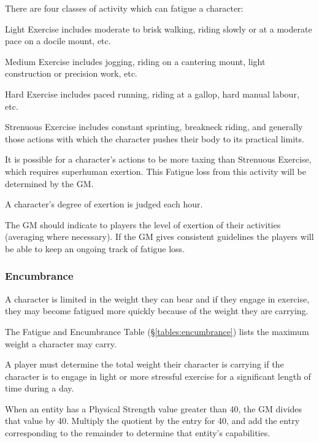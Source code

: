 \begin{multicols*}{3}
There are four classes of activity which can fatigue a character:
\begin{Enumerate}
\item
Light Exercise includes moderate to brisk walking, riding slowly or at
a moderate pace on a docile mount, etc.

\item
Medium Exercise includes jogging, riding on a cantering mount, light
construction or precision work, etc.

\item
Hard Exercise includes paced running, riding at a gallop, hard manual
labour, etc.

\item
Strenuous Exercise includes constant sprinting, breakneck riding, and
generally those actions with which the character pushes their body to
its practical limits.
\end{Enumerate}

It is possible for a character's actions to be more taxing than
Strenuous Exercise, which requires superhuman exertion. This Fatigue
loss from this activity will be determined by the GM.

A character's degree of exertion is judged each hour. 

The GM should indicate to players the level of exertion of their
activities (averaging where necessary). If the GM gives consistent
guidelines the players will be able to keep an ongoing track of
fatigue loss.

\subsubsection{Encumbrance}

A character is limited in the weight they can bear and if they engage
in exercise, they may become fatigued more quickly because of the
weight they are carrying.

The Fatigue and Encumbrance Table (\S\ref{tables:encumbrance}) lists
the maximum weight a character may carry.

A player must determine the total weight their character is carrying
if the character is to engage in light or more stressful exercise for
a significant length of time during a day.

When an entity has a Physical Strength value greater than 40, the GM
divides that value by 40. Multiply the quotient by the entry for 40,
and add the entry corresponding to the remainder to determine that
entity's capabilities.


\end{multicols*}
